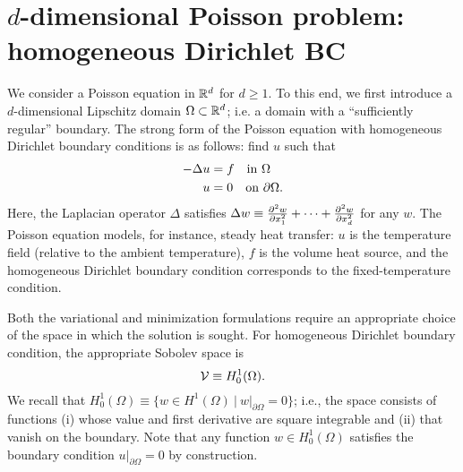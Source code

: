 \section{$d$-dimensional Poisson problem: homogeneous Dirichlet BC}
\label{sec:posnd_homo_dir}
We consider a Poisson equation in $\mathbb{R}^d$ for $d \geq 1$.  To this end, we first introduce a $d$-dimensional Lipschitz domain $\Omega \subset \mathbb{R}^d$; i.e. a domain with a ``sufficiently regular'' boundary. The strong form of the Poisson equation with homogeneous Dirichlet boundary conditions is as follows: find $u$ such that
\begin{align}
  - \Delta u &= f \quad \text{in } \Omega \label{eq:posnd_strong} \\
  u &= 0 \quad \text{on } \partial \Omega \notag.
\end{align}
 Here, the Laplacian operator $\Delta$ satisfies $\Delta w \equiv \frac{\partial ^2w}{\partial x^2_1} + \cdots + \frac{\partial ^2w}{\partial x^2_d}$ for any $w$.  The Poisson equation models, for instance, steady heat transfer: $u$ is the temperature field (relative to the ambient temperature), $f$ is the volume heat source, and the homogeneous Dirichlet boundary condition corresponds to the fixed-temperature condition.

Both the variational and minimization formulations require an appropriate choice of the space in which the solution is sought.  For homogeneous Dirichlet boundary condition, the appropriate Sobolev space is
\begin{equation*}
  \mathcal{V} \equiv H^1_0(\Omega).
\end{equation*}
We recall that $H^1_0(\Omega) \equiv \{ w \in H^1(\Omega) \ | \ w|_{\partial \Omega} = 0 \}$; i.e., the space consists of functions (i) whose value and first derivative are square integrable and (ii) that vanish on the boundary.  Note that any function $w \in H^1_0(\Omega)$ satisfies the boundary condition $u|_{\partial \Omega} = 0$ by construction.

